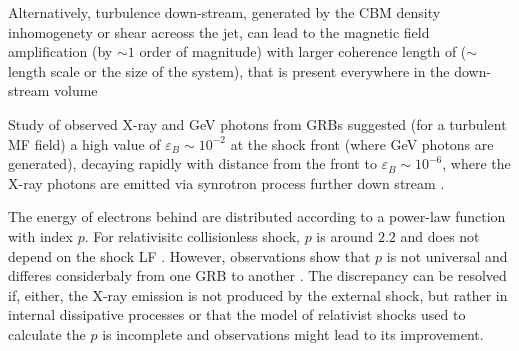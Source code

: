 Alternatively, turbulence down-stream, generated by the CBM density inhomogenety or shear acreoss the jet, can lead to the magnetic field amplification (by $\sim 1$ order of magnitude) with larger coherence length of ($\sim$ length scale or the size of the system), that is present everywhere in the down-stream volume \cite{e.g. Milosavljevic and Nakar, 2006; Sironi and Goodman, 2007; Goodman and MacFadyen, 2008; Couch et al., 2008; Inoue et al., 2011}

Study of observed X-ray and GeV photons from GRBs suggested (for a turbulent MF field) a high value of $\varepsilon_B\sim10^{-2}$ at the shock front (where GeV photons are generated), decaying rapidly with distance from the front to $\varepsilon_B\sim 10^{-6}$, where the X-ray photons are emitted via synrotron process further down stream \cite{Lemoine et al. (2013)}.


The energy of electrons behind are distributed according to a power-law function with index $p$. 
For relativisitc collisionless shock, $p$ is around $2.2$ and does not depend on the shock LF \cite{Bednarz and Ostrowski, 1998; Kirk et al., 2000; Achterberg  et al., 2001; Lemoine and Pelletier, 2003}. However, observations show that $p$ is not universal and differes considerbaly from one GRB to another \cite{Shen et al., 2006; Curran et al., 2009, 2010}. 
The discrepancy can be resolved if, either, the X-ray emission is not produced by the external shock, but rather in internal dissipative processes \cite{Ghisellini et al., 2007; Kumar et al., 2008b} or that the model of relativist shocks used to calculate the $p$ is incomplete and observations might lead to its improvement.

